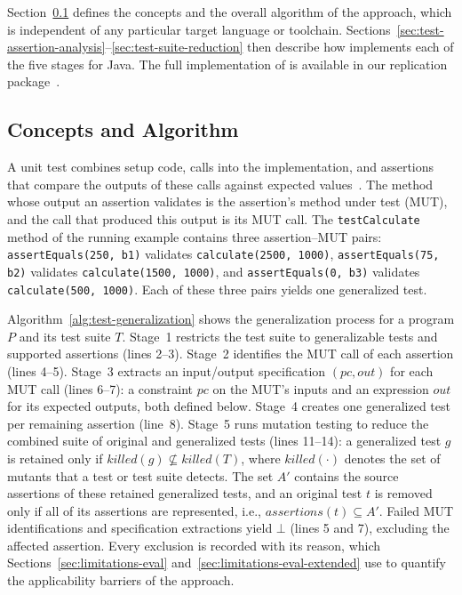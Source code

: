 Section~\ref{sec:approach-concepts} defines the concepts and the overall algorithm
of the approach, which is independent of any particular target language or toolchain.
Sections~\ref{sec:test-assertion-analysis}--\ref{sec:test-suite-reduction}
then describe how \ToolTeralizer{} implements each of the five stages for Java.
The full implementation of \ToolTeralizer{} is available in our replication package~\cite{replicationpackage}.

\subsection{Concepts and Algorithm}%
\label{sec:approach-concepts}

A unit test combines setup code, calls into the implementation,
and assertions that compare the outputs of these calls against expected values~\cite{meszaros_2007_xunit}.
The method whose output an assertion validates is the assertion's method under test (MUT),
and the call that produced this output is its MUT call.
The \texttt{testCalculate} method of the running example
contains three assertion--MUT pairs:
\texttt{assertEquals(250, b1)} validates \texttt{calculate(2500, 1000)},
\texttt{assertEquals(75, b2)} validates \texttt{calculate(1500, 1000)},
and \texttt{assertEquals(0, b3)} validates \texttt{calculate(500, 1000)}.
Each of these three pairs yields one generalized test.

Algorithm~\ref{alg:test-generalization} shows the generalization process
for a program $P$ and its test suite $T$.
Stage~1 restricts the test suite to generalizable tests and supported assertions (lines 2--3).
Stage~2 identifies the MUT call of each assertion (lines 4--5).
Stage~3 extracts an input/output specification $(\mathit{pc}, \mathit{out})$
for each MUT call (lines 6--7):
a constraint $\mathit{pc}$ on the MUT's inputs
and an expression $\mathit{out}$ for its expected outputs,
both defined below.
Stage~4 creates one generalized test per remaining assertion (line~8).
Stage~5 runs mutation testing
to reduce the combined suite of original and generalized tests (lines 11--14):
a generalized test $g$ is retained only if $\mathit{killed}(g) \not\subseteq \mathit{killed}(T)$,
where $\mathit{killed}(\cdot)$ denotes the set of mutants that a test or test suite detects.
The set $A'$ contains the source assertions of these retained generalized tests,
and an original test $t$ is removed only if all of its assertions are represented,
i.e., $\mathit{assertions}(t) \subseteq A'$.
Failed MUT identifications and specification extractions yield $\bot$ (lines 5 and 7),
excluding the affected assertion.
Every exclusion is recorded with its reason,
which Sections~\ref{sec:limitations-eval} and~\ref{sec:limitations-eval-extended} use
to quantify the applicability barriers of the approach.

